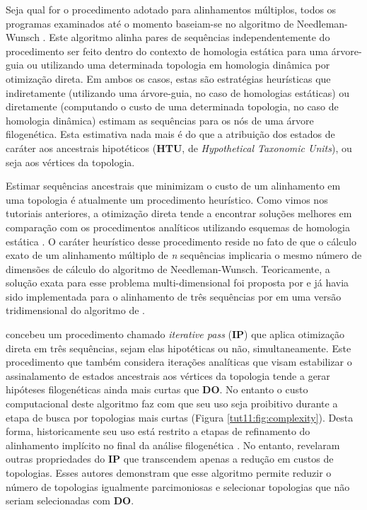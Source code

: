 \begin{refsection}
Seja qual for o procedimento adotado para alinhamentos múltiplos, todos os programas examinados até o momento baseiam-se no algoritmo de Needleman-Wunsch \parencite{Needleman_and_Wunsch_1970,Phillips_et_al_2000}. Este algoritmo alinha pares de sequências independentemente do procedimento ser feito dentro do contexto de homologia estática para uma árvore-guia ou utilizando uma determinada topologia em homologia dinâmica por otimização direta. Em ambos os casos, estas são estratégias heurísticas que indiretamente (utilizando uma árvore-guia, no caso de homologias estáticas) ou diretamente (computando o custo de uma determinada topologia, no caso de homologia dinâmica) estimam as sequências para os nós de uma árvore filogenética. Esta estimativa nada mais é do que a atribuição dos estados de caráter aos ancestrais hipotéticos (\textbf{HTU}, de \textit{Hypothetical Taxonomic Units}), ou seja aos vértices da topologia.

Estimar sequências ancestrais \parencite[\textit{protosequences} senso][]{Sankoff_and_Cedergren_1973} que minimizam o custo de um alinhamento em uma topologia é atualmente um procedimento heurístico. Como vimos nos tutoriais anteriores, a otimização direta tende a encontrar soluções melhores em comparação com os procedimentos analíticos utilizando esquemas de homologia estática \parencite[veja Tutoriais \ref{tut9} e \ref{tut10}, ][]{Giribet_at_al_2002}. O caráter heurístico desse procedimento reside no fato de que o cálculo exato de um alinhamento múltiplo de \textit{n} sequências implicaria o mesmo número de dimensões de cálculo do algoritmo de Needleman-Wunsch. Teoricamente, a solução exata para esse problema multi-dimensional foi proposta por \textcite{Sankoff_et_al_1976} e já havia sido implementada para o alinhamento de três sequências por \textcite{Sankoff_and_Cedergren_1973} em uma versão tridimensional do algoritmo de \textcite{Needleman_and_Wunsch_1970}.

\textcite{Wheeler_2003b} concebeu um procedimento chamado \textit{iterative pass} (\textbf{IP}) que aplica otimização direta em três sequências, sejam elas hipotéticas ou não, simultaneamente. Este procedimento que também considera iterações analíticas que visam estabilizar o assinalamento de estados ancestrais aos vértices da topologia \parencite[\textit{i.e., iterative improvement}; veja][]{Wheeler_2003b} tende a gerar hipóteses filogenéticas ainda mais curtas que \textbf{DO}. No entanto o custo computacional deste algoritmo faz com que seu uso seja proibitivo durante a etapa de busca por topologias mais curtas (Figura \ref{tut11:fig:complexity}). Desta forma, historicamente seu uso está restrito a etapas de refinamento do alinhamento implícito no final da análise filogenética \parencite[\textit{e.g.},][]{Grant_et_al_2006,Dikow_2009,Jungfer_et_al_2013,Caira_et_al_2013,Pinto-da-Rocha_et_al_2014}. No entanto, \textcite{Machado_and_Marques_2013} revelaram outras propriedades do \textbf{IP} que transcendem apenas a redução em custos de topologias. Esses autores demonstram que esse algoritmo permite reduzir o número de topologias igualmente parcimoniosas e selecionar topologias que não seriam selecionadas com \textbf{DO}.


\end{refsection}
